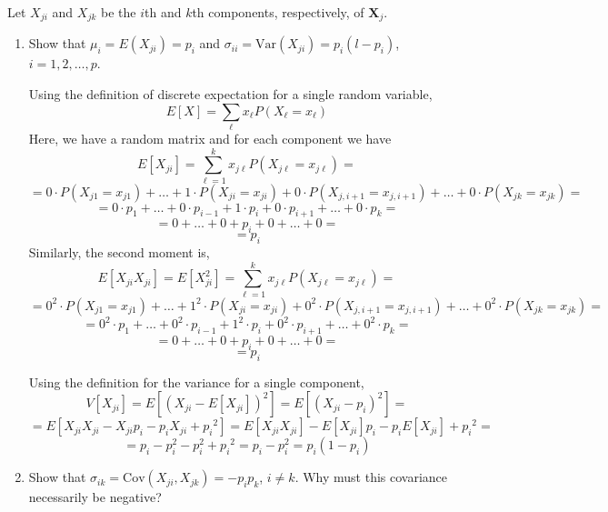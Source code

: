 Let $X_{ji}$ and $X_{jk}$ be the $i$th and $k$th components, respectively, of $\textbf{X}_{j}$.
\begin{enumerate}
    \item Show that $\mu_{i} = E(X_{ji}) = p_{i}$ and $\sigma_{ii} = \text{Var}(X_{ji}) = p_{i}(l - p_{i})$, $i = 1, 2, \dots, p$.
    
    Using the definition of discrete expectation for a single random variable,
    \[
        E[X] = \sum_{\ell}x_{\ell}P(X_{\ell} = x_{\ell})
    \]
    Here, we have a random matrix and for each component we have
    \[
        E[X_{ji}]
        =
        \sum_{\ell=1}^{k}x_{j\ell}P(X_{j\ell} = x_{j\ell})
        =
    \]
    \[{\scriptstyle 
        =
        0 \cdot P(X_{j1} = x_{j1}) + \dots + 1 \cdot P(X_{ji} = x_{ji}) + 0 \cdot P(X_{j,i+1} = x_{j,i+1}) + \dots + 0 \cdot P(X_{jk} = x_{jk})
        =
    }
    \]
    \[
        =
        0 \cdot p_{1} + \dots + 0 \cdot p_{i-1} + 1 \cdot p_{i} + 0 \cdot p_{i+1} + \dots + 0 \cdot p_{k}
        =
    \]
    \[
        =
        0 + \dots + 0 + p_{i} + 0 + \dots + 0
        =
    \]
    \[
        =
        p_{i}
    \]
    Similarly, the second moment is,
    \[
        E[X_{ji}X_{ji}]
        =
        E[X_{ji}^{2}]
        =
        \sum_{\ell=1}^{k}x_{j\ell}P(X_{j\ell} = x_{j\ell})
        =
    \]
    \[{\scriptstyle 
        =
        0^{2} \cdot P(X_{j1} = x_{j1}) + \dots + 1^{2} \cdot P(X_{ji} = x_{ji}) + 0^{2} \cdot P(X_{j,i+1} = x_{j,i+1}) + \dots + 0^{2} \cdot P(X_{jk} = x_{jk})
        =
    }
    \]
    \[
        =
        0^{2} \cdot p_{1} + \dots + 0^{2} \cdot p_{i-1} + 1^{2} \cdot p_{i} + 0^{2} \cdot p_{i+1} + \dots + 0^{2} \cdot p_{k}
        =
    \]
    \[
        =
        0 + \dots + 0 + p_{i} + 0 + \dots + 0
        =
    \]
    \[
        =
        p_{i}
    \]

    Using the definition for the variance for a single component,
    \[
        V[X_{ji}]
        =
        E[{(X_{ji}-E[X_{ji}])}^{2}]
        =
        E[{(X_{ji}-p_{i})}^{2}]
        =
    \]
    \[
        =
        E[X_{ji}X_{ji} - X_{ji}p_{i} - p_{i}X_{ji} + {p_{i}}^{2}]
        =
        E[X_{ji}X_{ji}] - E[X_{ji}]p_{i} - p_{i}E[X_{ji}] + {p_{i}}^{2}
        =
    \]
    \[
        =
        p_{i} - p_{i}^{2} - p_{i}^{2} + {p_{i}}^{2}
        =
        p_{i} - p_{i}^{2}
        =
        p_{i}(1 - p_{i})
    \]
    \item Show that $\sigma_{ik} = \text{Cov}(X_{ji}, X_{jk}) = - p_{i}p_{k}$, $i \ne k$. Why must this covariance necessarily be negative?
    

\end{enumerate}
